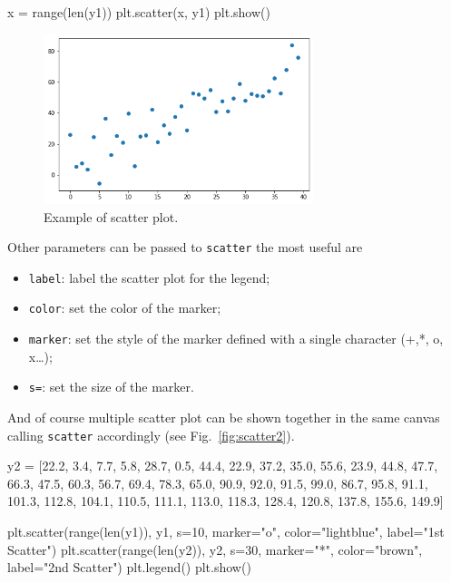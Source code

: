 \begin{ipython}
\begin{ipython}
x = range(len(y1))
plt.scatter(x, y1)
plt.show()
\end{ipython}

\begin{figure}[htb]
	\centering
	\includegraphics[width=0.7\textwidth]{figures/scatter}
	\caption{Example of scatter plot.}
	\label{fig:scatter}
\end{figure}

Other parameters can be passed to \texttt{scatter} the most useful are

\begin{itemize}
	\tightlist
	\item
	\texttt{label}: label the scatter plot for the legend;
	\item
	\texttt{color}: set the color of the marker;
	\item
	\texttt{marker}: set the style of the marker defined with a single
	character (+,*, o, x\ldots{});
	\item
	\texttt{s=}: set the size of the marker.
\end{itemize}

And of course multiple scatter plot can be shown together in the same
canvas calling \texttt{scatter} accordingly (see Fig.~\ref{fig:scatter2}).

\begin{ipython}
y2 = [22.2, 3.4, 7.7, 5.8, 28.7, 0.5, 44.4, 22.9, 37.2, 35.0, 55.6,
      23.9, 44.8, 47.7, 66.3, 47.5, 60.3, 56.7, 69.4, 78.3, 65.0,
      90.9, 92.0, 91.5, 99.0, 86.7, 95.8, 91.1, 101.3, 112.8,
      104.1, 110.5, 111.1, 113.0, 118.3, 128.4, 120.8, 137.8, 155.6, 149.9]

plt.scatter(range(len(y1)), y1, s=10, marker="o",
color="lightblue", label="1st Scatter")
plt.scatter(range(len(y2)), y2, s=30, marker="*",
color="brown", label="2nd Scatter")
plt.legend()
plt.show()
\end{ipython}


\end{ipython}
